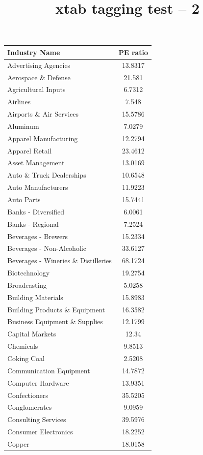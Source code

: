 \documentclass{article}
\title{xtab tagging test -- 2}
\begin{document}
\begin{xtabular}{|l|c|}
\hline
Industry Name & PE ratio \\ \hline
Advertising Agencies & 13.8317\\\hline
Aerospace \& Defense & 21.581 \\ \hline
Agricultural Inputs & 6.7312 \\ \hline
Airlines & 7.548 \\ \hline
Airports \& Air Services & 15.5786 \\ \hline
Aluminum & 7.0279 \\ \hline
Apparel Manufacturing & 12.2794\\ \hline
Apparel Retail & 23.4612 \\ \hline
Asset Management& 13.0169\\ \hline
Auto \& Truck Dealerships& 10.6548\\ \hline
Auto Manufacturers& 11.9223\\ \hline
Auto Parts& 15.7441 \\ \hline
Banks - Diversified& 6.0061\\ \hline
Banks - Regional& 7.2524\\ \hline
Beverages - Brewers& 15.2334 \\ \hline
Beverages - Non-Alcoholic & 33.6127\\ \hline
Beverages - Wineries \& Distilleries & 68.1724\\ \hline
Biotechnology & 19.2754\\ \hline
Broadcasting & 5.0258\\ \hline
Building Materials & 15.8983\\ \hline
Building Products \& Equipment & 16.3582\\ \hline
Business Equipment \& Supplies & 12.1799\\ \hline
Capital Markets & 12.34\\ \hline
Chemicals & 9.8513\\ \hline
Coking Coal & 2.5208\\ \hline
Communication Equipment & 14.7872\\ \hline
Computer Hardware & 13.9351\\ \hline
Confectioners & 35.5205\\ \hline
Conglomerates & 9.0959\\ \hline
Consulting Services & 39.5976\\ \hline
Consumer Electronics & 18.2252\\ \hline
Copper & 18.0158\\ \hline

\end{xtabular}
\end{document}
